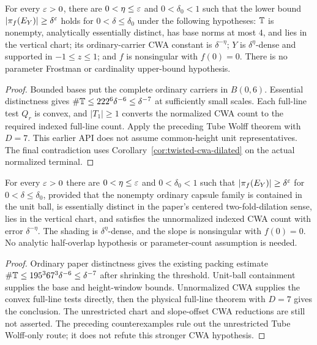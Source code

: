 \begin{theorem}
\label{thm:twisted-cwa-normalized}
\leanok
{}
For every $\varepsilon>0$, there are $0<\eta\leq\varepsilon$ and
$0<\delta_0<1$ such that the lower bound
$|\pi_f(E_Y)|\geq\delta^\varepsilon$ holds for $0<\delta\leq\delta_0$
under the following hypotheses: $\mathbb{T}$ is nonempty, analytically
essentially distinct, has base norms at most $4$, and lies in the vertical
chart; its ordinary-carrier CWA constant is $\delta^{-\eta}$;
$Y$ is $\delta^\eta$-dense and supported in $-1\leq z\leq1$;
and $f$ is nonsingular with $f(0)=0$.
There is no parameter Frostman or cardinality upper-bound hypothesis.
\end{theorem}
\begin{proof}
\leanok
{}
Bounded bases put the complete ordinary carriers in $B(0,6)$.
Essential distinctness gives
$\#\mathbb{T}\leq222^6\delta^{-6}\leq\delta^{-7}$ at sufficiently small
scales. Each full-line test $Q_r$ is convex, and $|T_1|\geq1$ converts
the normalized CWA count to the required indexed full-line count.
Apply the preceding Tube Wolff theorem with $D=7$.
This earlier API does not assume common-height unit representatives.
The final contradiction uses Corollary~\ref{cor:twisted-cwa-dilated}
on the actual normalized terminal.
\end{proof}


\begin{corollary}
\label{cor:twisted-cwa-paper-normalized}
\leanok
{}
For every $\varepsilon>0$ there are $0<\eta\leq\varepsilon$ and
$0<\delta_0<1$ such that $|\pi_f(E_Y)|\geq\delta^\varepsilon$
for $0<\delta\leq\delta_0$, provided that the nonempty ordinary
capsule family is contained in the unit ball, is essentially distinct in
the paper's centered two-fold-dilation sense, lies in the vertical chart,
and satisfies the unnormalized indexed CWA count with error
$\delta^{-\eta}$. The shading is $\delta^\eta$-dense, and the slope
is nonsingular with $f(0)=0$.
No analytic half-overlap hypothesis or parameter-count assumption is needed.
\end{corollary}
\begin{proof}
\leanok
{}
Ordinary paper distinctness gives the existing packing estimate
$\#\mathbb{T}\leq195^3 67^3\delta^{-6}\leq\delta^{-7}$ after shrinking
the threshold. Unit-ball containment supplies the base and height-window
bounds. Unnormalized CWA supplies the convex full-line tests directly,
then the physical full-line theorem with $D=7$ gives the conclusion.
The unrestricted chart and slope-offset CWA reductions are still not
asserted. The preceding counterexamples rule out the unrestricted
Tube Wolff-only route; it does not refute this stronger CWA hypothesis.
\end{proof}

